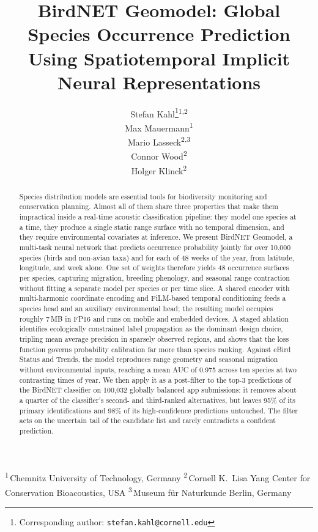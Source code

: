 \documentclass{article}
\title{BirdNET Geomodel: Global Species Occurrence Prediction\\
       Using Spatiotemporal Implicit Neural Representations}
\author{
  Stefan Kahl\thanks{Corresponding author: \texttt{stefan.kahl@cornell.edu}}\;\textsuperscript{1,2} \\
  \And
  Max Mauermann\;\textsuperscript{1} \\
  \And
  Mario Lasseck\;\textsuperscript{2,3} \\
  \And
  Connor Wood\;\textsuperscript{2} \\
  \And
  Holger Klinck\;\textsuperscript{2} \\
}
\date{}
\begin{document}
\maketitle

\begin{center}
\begin{minipage}{0.9\linewidth}
\centering\footnotesize
\textsuperscript{1}\,Chemnitz University of Technology, Germany \quad
\textsuperscript{2}\,Cornell K.\ Lisa Yang Center for Conservation Bioacoustics, USA \quad
\textsuperscript{3}\,Museum für Naturkunde Berlin, Germany
\end{minipage}
\end{center}
\vspace{1em}

\begin{abstract}
Species distribution models are essential tools for biodiversity monitoring and
conservation planning. Almost all of them share three properties that make them
impractical inside a real-time acoustic classification pipeline: they model one species
at a time, they produce a single static range surface with no temporal dimension, and
they require environmental covariates at inference. We present BirdNET Geomodel, a
multi-task neural network that predicts occurrence probability jointly for over 10,000
species (birds and non-avian taxa) and for each of 48 weeks of the year, from latitude,
longitude, and week alone. One set of weights therefore yields 48 occurrence surfaces per
species, capturing migration, breeding phenology, and seasonal range contraction without
fitting a separate model per species or per time slice. A shared encoder with
multi-harmonic coordinate encoding and FiLM-based temporal conditioning feeds a species
head and an auxiliary environmental head; the resulting model occupies roughly 7\,MB in
FP16 and runs on mobile and embedded devices. A staged ablation identifies ecologically
constrained label propagation as the dominant design choice, tripling mean average
precision in sparsely observed regions, and shows that the loss function governs
probability calibration far more than species ranking. Against eBird Status and Trends,
the model reproduces range geometry and seasonal migration without environmental inputs,
reaching a mean AUC of 0.975 across ten species at two contrasting times of year. We then
apply it as a post-filter to the top-3 predictions of the BirdNET classifier on 100,032
globally balanced app submissions: it removes about a quarter of the classifier's second-
and third-ranked alternatives, but leaves 95\% of its primary identifications and 98\% of
its high-confidence predictions untouched. The filter acts on the uncertain tail of the
candidate list and rarely contradicts a confident prediction.
\end{abstract}








\end{document}
